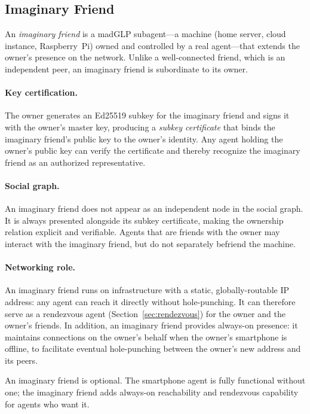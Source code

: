 \subsection{Imaginary Friend}
\label{sec:imaginary-friend}
An \emph{imaginary friend} is a madGLP subagent---a machine (home server, cloud instance, Raspberry~Pi) owned and controlled by a real agent---that extends the owner's presence on the network.  Unlike a well-connected friend, which is an independent peer, an imaginary friend is subordinate to its owner.

\paragraph{Key certification.}
The owner generates an Ed25519 subkey for the imaginary friend and signs it with the owner's master key, producing a \emph{subkey certificate} that binds the imaginary friend's public key to the owner's identity.  Any agent holding the owner's public key can verify the certificate and thereby recognize the imaginary friend as an authorized representative.

\paragraph{Social graph.}
An imaginary friend does not appear as an independent node in the social graph.  It is always presented alongside its subkey certificate, making the ownership relation explicit and verifiable.  Agents that are friends with the owner may interact with the imaginary friend, but do not separately befriend the machine.

\paragraph{Networking role.}
An imaginary friend runs on infrastructure with a static, globally-routable IP address: any agent can reach it directly without hole-punching.  It can therefore serve as a rendezvous agent (Section~\ref{sec:rendezvous}) for the owner and the owner's friends.  In addition, an imaginary friend provides always-on presence: it maintains connections on the owner's behalf when the owner's smartphone is offline, to facilitate eventual hole-punching between the owner's new address and its peers.

An imaginary friend is optional.  The smartphone agent is fully functional without one; the imaginary friend adds always-on reachability and rendezvous capability for agents who want it.
